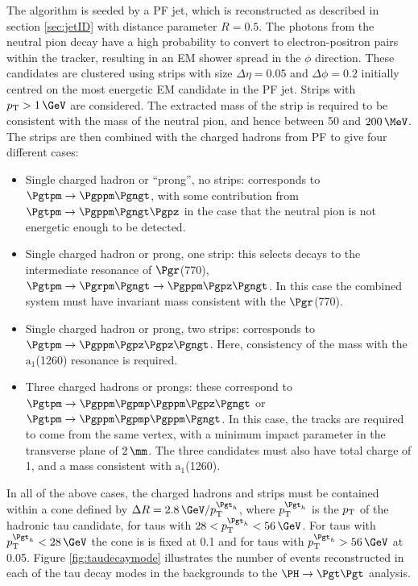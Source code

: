 The algorithm is seeded by a \ac{PF} jet, which is reconstructed as described in
section \ref{sec:jetID} with distance parameter $R=0.5$. The photons from the neutral pion decay have a high
probability to convert to electron-positron pairs within the tracker, resulting
in an EM shower spread in the $\phi$ direction. These candidates are clustered
using strips with size $\Delta\eta = 0.05$ and $\Delta\phi = 0.2$ initially
centred on the most energetic EM candidate in the \ac{PF} jet. Strips with
$\pt>1\,\GeV$ are considered. The extracted mass of the
strip is required to be consistent with the mass of the neutral pion, and hence
between 50 and $200\,\MeV$. The strips are then combined with the charged hadrons
from \ac{PF} to give four different cases:

\begin{itemize}
\item Single charged hadron or ``prong'', no strips: corresponds to $\Pgtpm\to\Pgppm\Pgngt$,
with some contribution from $\Pgtpm\to\Pgppm\Pgngt\Pgpz$ in the case that the
neutral pion is not energetic enough to be detected.
\item Single charged hadron or prong, one strip: this selects decays to the intermediate
resonance of $\Pgr$(770), $\Pgtpm\to\Pgrpm\Pgngt\to\Pgppm\Pgpz\Pgngt$. In this
case the combined system must have invariant mass consistent with the
$\Pgr$(770).
\item Single charged hadron or prong, two strips: corresponds to
$\Pgtpm\to\Pgppm\Pgpz\Pgpz\Pgngt$. Here, consistency of the mass with the
$\text{a}_{1}$(1260) resonance is required. 
\item Three charged hadrons or prongs: these correspond to
$\Pgtpm\to\Pgppm\Pgpmp\Pgppm\Pgpz\Pgngt$ or $\Pgtpm\to\Pgppm\Pgpmp\Pgppm\Pgngt$. 
In this case, the tracks are required
to come from the same vertex, with a minimum impact parameter in the transverse
plane of $2\,\mm$. The three candidates must also have total charge of 1, and a
mass consistent with $\text{a}_{1}$(1260). 
\end{itemize}

In all of the above cases, the charged hadrons and strips must be contained
within a cone defined by $\Delta R=2.8\,\GeV/\pt^{\Pgth}$, where
$\pt^{\Pgth}$ is the $p_{\mathrm{T}}$ of the hadronic tau candidate, for taus with $28 <
\pt^{\Pgth} < 56\,\GeV$. For taus with $\pt^{\Pgth} < 28\,\GeV$ the cone is
is fixed at 0.1 and for taus with $\pt^{\Pgth} > 56\,\GeV$ at 0.05. 
Figure \ref{fig:taudecaymode} illustrates the number of events reconstructed in
each of the tau decay modes in the backgrounds to the $\PH \to \Pgt\Pgt$ analysis.

